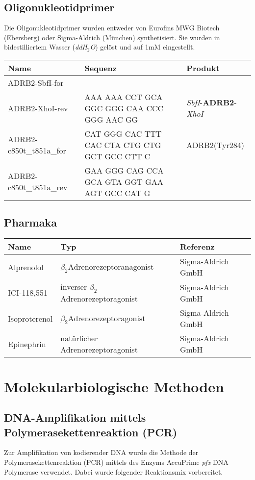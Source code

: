 \subsection{Oligonukleotidprimer}
Die Oligonukleotidprimer wurden entweder von Eurofins MWG Biotech (Ebersberg) oder Sigma-Aldrich (München) synthetisiert. Sie wurden in bidestilliertem Wasser (\textit{ddH$_2$O}) gelöst und auf 1\si{\milli M} eingestellt. 
 
\begin{tabularx}{\textwidth}{lXl}
\toprule
Name		&	Sequenz 					&	Produkt\\
\midrule
ADRB2-SbfI-for	&&\\
ADRB2-XhoI-rev	&	AAA AAA CCT GCA GGC GGG CAA CCC GGG AAC GG	&	\textit{SbfI}-\textbf{ADRB2}-\textit{XhoI}\\
ADRB2-c850t\_t851a\_for	& 	CAT GGG CAC TTT CAC CTA CTG CTG GCT GCC CTT C & ADRB2(Tyr284)\\
ADRB2-c850t\_t851a\_rev	&	GAA GGG CAG CCA GCA GTA GGT GAA AGT GCC CAT G &\\
\bottomrule
\end{tabularx}

\subsection{Pharmaka}
\begin{tabularx}{\textwidth}{lll}
\toprule
Name			&	Typ										&	Referenz\\
\midrule
Alprenolol		&	$\beta_2$\-Adrenorezeptoranagonist				&	Sigma-Aldrich GmbH\\
ICI-118,551		&	inverser $\beta_2$\-Adrenorezeptoragonist		&	Sigma-Aldrich GmbH\\
Isoproterenol	&	$\beta_2$\-Adrenorezeptoragonist				&	Sigma-Aldrich GmbH\\
Epinephrin		&	natürlicher Adrenorezeptoragonist				& 	Sigma-Aldrich GmbH\\
\bottomrule
\end{tabularx}

\section{Molekularbiologische Methoden}
\subsection{DNA-Amplifikation mittels Polymerasekettenreaktion (PCR)}
Zur Amplifikation von kodierender DNA wurde die Methode der Polymerasekettenreaktion (PCR) mittels des Enzyms AccuPrime \textit{pfx} DNA Polymerase verwendet. Dabei wurde folgender Reaktionsmix vorbereitet.


